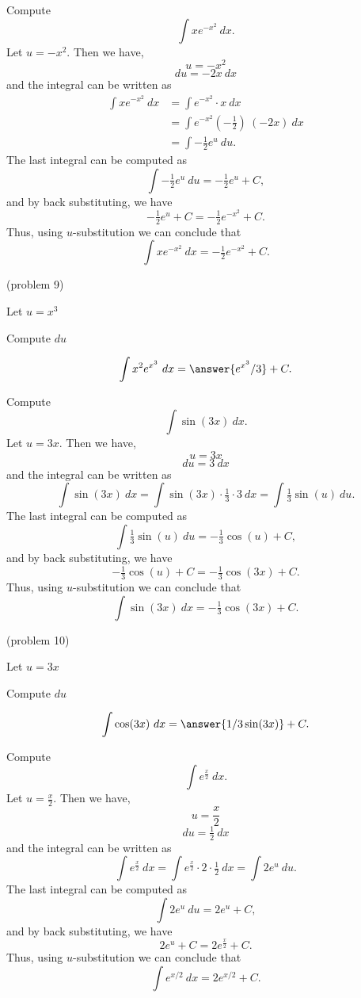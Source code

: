\documentclass[handout]{ximera}
\begin{document}
\begin{example}[example 9] Compute 
\[\int xe^{-x^2} \ dx.\]
Let $u = -x^2 $.  Then we have,
\[u = -x^2\]
\[du = -2x \ dx\]
and the integral can be written as
\begin{align*}
\int xe^{-x^2} \ dx &= \int e^{-x^2} \cdot x\  dx \\
&=  \int e^{-x^2}( -\tfrac12)\ (-2x)\  dx \\
&=  \int -\tfrac12 e^u \ du.
\end{align*}
The last integral can be computed as 
\[ \int -\tfrac12 e^u \ du = -\tfrac12 e^u + C,\]
and by back substituting, we have 
\[-\tfrac12 e^u + C = -\tfrac12 e^{-x^2} + C.\]
Thus, using $u$-substitution we can conclude that
\[\int xe^{-x^2} \ dx =  -\tfrac12 e^{-x^2} + C.\]
\end{example}


\begin{problem}(problem 9)
\begin{hint}
Let $u = x^3$
\end{hint}
\begin{hint}
Compute $du$
\end{hint}
\[\int x^2e^{x^3} \ dx = \answer{e^{x^3}/3} +C.\]
\end{problem}




\begin{example}[example 10] Compute 
\[\int \sin(3x) \ dx.\]
Let $u = 3x$.  Then we have,
\[u = 3x\]
\[du = 3 \ dx\]
and the integral can be written as 
\[\int\sin(3x) \ dx =  \int \sin(3x) \cdot \tfrac13\cdot 3 \   dx =   \int \tfrac13 \sin(u) \ du.\]
The last integral can be computed as 
\[ \int \tfrac13 \sin(u) \ du = -\tfrac13 \cos(u) + C,\]
and by back substituting, we have 
\[-\tfrac13 \cos(u) + C = -\tfrac13 \cos(3x) + C.\]
Thus, using $u$-substitution we can conclude that
\[\int \sin(3x) \ dx =  -\tfrac13 \cos(3x) + C.\]
\end{example}

\begin{problem}(problem 10)
\begin{hint}
Let $u = 3x$
\end{hint}
\begin{hint}
Compute $du$
\end{hint}
\[\int \cos(3x) \ dx = \answer{1/3 \sin(3x)} +C.\]
\end{problem}






\begin{example}[example 11] Compute 
\[\int e^{\frac{x}{2}} \ dx.\]
Let $u = \frac{x}{2}$.  Then we have,
\[u = \frac{x}{2}\]
\[du = \tfrac12 \ dx\]
and the integral can be written as 
\[\int e^{\frac{x}{2}} \ dx =  \int e^{\frac{x}{2}} \cdot 2\cdot \tfrac{1}{2}  \   dx =   \int 2e^u \ du.\]
The last integral can be computed as 
\[\int 2e^u \ du = 2 e^u + C,\]
and by back substituting, we have 
\[2e^u + C = 2e^{\frac{x}{2}}+ C.\]
Thus, using $u$-substitution we can conclude that
\[\int e^{x/2} \ dx = 2e^{x/2} + C.\]
\end{example}
\end{document}
